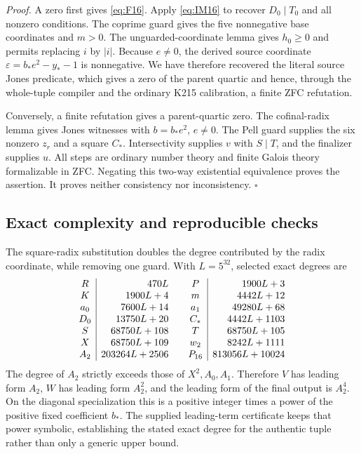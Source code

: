 \emph{Proof.}
A zero first gives \eqref{eq:F16}.  Apply \eqref{eq:IM16} to
recover \(D_0\mid T_0\) and all nonzero conditions.
The coprime guard gives the five nonnegative base coordinates and
\(m>0\).  The unguarded-coordinate lemma gives \(h_0\ge0\)
and permits replacing \(i\) by \(|i|\).
Because \(e\ne0\), the derived source coordinate
\(\varepsilon=b_*e^2-y_*-1\) is nonnegative.  We have therefore
recovered the literal source Jones predicate, which gives a zero of
the parent quartic and hence, through the whole-tuple compiler and
the ordinary K215 calibration, a finite ZFC refutation.

Conversely, a finite refutation gives a parent-quartic zero.
The cofinal-radix lemma gives Jones witnesses with
\(b=b_*e^2\), \(e\ne0\).  The Pell guard supplies the six
nonzero \(z_r\) and a square \(C_*\).
Intersectivity supplies \(v\) with \(S\mid T\), and the
finalizer supplies \(u\).  All steps are ordinary number theory
and finite Galois theory formalizable in ZFC.  Negating this
two-way existential equivalence proves the assertion.
It proves neither consistency nor inconsistency. \hfill\(\square\)

\subsection{Exact complexity and reproducible checks}

The square-radix substitution doubles the degree contributed by the
radix coordinate, while removing one guard.  With \(L=5^{32}\),
selected exact degrees are
\[
\begin{array}{c|r@{\qquad}c|r}
 R&470L&P&1900L+3\\
 K&1900L+4&m&4442L+12\\
 a_0&7600L+14&a_1&49280L+68\\
 D_0&13750L+20&C_*&4442L+1103\\
 S&68750L+108&T&68750L+105\\
 X&68750L+109&w_2&8242L+1111\\
 A_2&203264L+2506&P_{16}&813056L+10024
\end{array}
\]
The degree of \(A_2\) strictly exceeds those of
\(X^2,A_0,A_1\).  Therefore \(V\) has leading form \(A_2\),
\(W\) has leading form \(A_2^2\), and the leading form of the
final output is \(A_2^4\).  On the diagonal specialization this is
a positive integer times a power of the positive fixed coefficient
\(b_*\).  The supplied leading-term certificate keeps that power
symbolic, establishing the stated exact degree for the authentic
tuple rather than only a generic upper bound.

